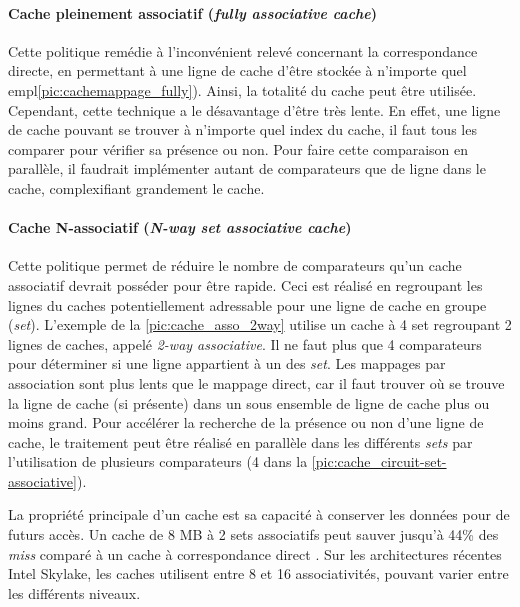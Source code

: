         \paragraph{Cache pleinement associatif (\textit{fully associative cache})} 
            
            Cette politique remédie à l'inconvénient relevé concernant la correspondance directe, en permettant à une ligne de cache d'être stockée à n'importe quel empl\autoref{pic:cachemappage_fully}). Ainsi, la totalité du cache peut être utilisée. Cependant, cette technique a le désavantage d'être très lente. En effet, une ligne de cache pouvant se trouver à n'importe quel index du cache, il faut tous les comparer pour vérifier sa présence ou non. Pour faire cette comparaison en parallèle, il faudrait implémenter autant de comparateurs que de ligne dans le cache, complexifiant grandement le cache.
            
            
            
        \paragraph{Cache N-associatif (\textit{N-way set associative cache})} 
            
            Cette politique permet de réduire le nombre de comparateurs qu'un cache associatif devrait posséder pour être rapide. Ceci est réalisé en regroupant les lignes du caches potentiellement adressable pour une ligne de cache en groupe (\textit{set}). L'exemple de la \autoref{pic:cache_asso_2way} utilise un cache à 4 set regroupant 2 lignes de caches, appelé \textit{2-way associative}. Il ne faut plus que 4 comparateurs pour déterminer si une ligne appartient à un des \textit{set}. Les mappages par association sont plus lents que le mappage direct, car il faut trouver où se trouve la ligne de cache (si présente) dans un sous ensemble de ligne de cache plus ou moins grand. Pour accélérer la recherche de la présence ou non d'une ligne de cache, le traitement peut être réalisé en parallèle dans les différents \textit{sets} par l'utilisation de plusieurs comparateurs (4 dans la \autoref{pic:cache_circuit-set-associative}). 
        
            La propriété principale d'un cache est sa capacité à conserver les données pour de futurs accès. Un cache de 8 MB à 2 sets associatifs peut sauver jusqu'à 44\% des \textit{miss} comparé à un cache à correspondance direct \cite{Drepper2007}. Sur les architectures récentes Intel Skylake, les caches utilisent entre 8 et 16 associativités, pouvant varier entre les différents niveaux. 
       
